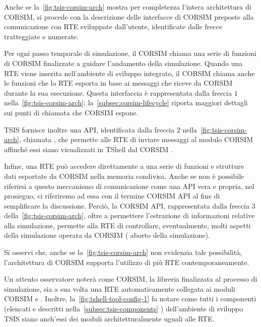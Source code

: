 Anche se la~\vref{fig:tsis-corsim-arch} mostra per completezza l'intera architettura di \acs{CORSIM}, si procede con la descrizione delle interfacce di \acs{CORSIM} preposte alla comunicazione con \acs{RTE} sviluppate dall'utente, identificate dalle frecce tratteggiate e numerate.

Per ogni passo temporale di simulazione, il \acs{CORSIM}  chiama una serie di funzioni di \acs{CORSIM} finalizzate a guidare l'andamento della simulazione. Quando una \acs{RTE} viene inserita nell'ambiente di sviluppo integrato, il \acs{CORSIM}  chiama anche le funzioni che la \acs{RTE} esporta in base ai messaggi che riceve da \acs{CORSIM} durante la sua esecuzione. Questa interfaccia è rappresentata dalla freccia $1$ nella~\vref{fig:tsis-corsim-arch}; la~\autoref{subsec:corsim-lifecycle}  riporta maggiori dettagli sui punti di chiamata che \acs{CORSIM} espone.

\acs{TSIS} fornisce inoltre una \acs{API}, identificata dalla freccia $2$ nella~\vref{fig:tsis-corsim-arch}, chiamata , che permette alle \acs{RTE} di inviare messaggi al modulo \acs{CORSIM}  affinché essi siano visualizzati in \acs{TShell} dal \acs{CORSIM} .

Infine, una \acs{RTE} può accedere direttamente a una serie di funzioni e strutture dati esportate da \acs{CORSIM} nella memoria condivisa. Anche se non è possibile riferirsi a questo meccanismo di comunicazione come una \acs{API} vera e propria, nel prosieguo, ci riferiremo ad essa con il termine \acs{CORSIM} \acs{API} al fine di semplificare la discussione. Perciò, la \acs{CORSIM} \acs{API}, rappresentata dalla freccia $3$ della~\vref{fig:tsis-corsim-arch}, oltre a permettere l'estrazione di informazioni relative alla simulazione, permette alla \acs{RTE} di controllare, eventualmente, molti aspetti della simulazione operata da \acs{CORSIM} (\eg{} aborto della simulazione). 

Si osservi che, anche se la~\vref{fig:tsis-corsim-arch} non evidenzia tale possibilità, l'architettura di \acs{CORSIM} supporta l'utilizzo di più \acs{RTE} contemporaneamente.

\begin{nota}
Un attento osservatore noterà come \acs{CORSIM}, la libreria finalizzata al processo di simulazione, sia a sua volta una \acs{RTE} automaticamente collegata ai moduli \acs{CORSIM}  e . Inoltre, la~\vref{fig:tshell-tool-config-1} fa notare come tutti i componenti (elencati e descritti nella~\autoref{subsec:tsis-components} ) dell'ambiente di sviluppo \acs{TSIS} siano anch'essi dei moduli architetturalmente uguali alle \acs{RTE}.
\end{nota}

